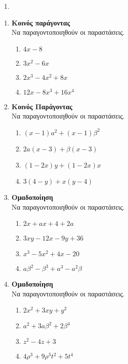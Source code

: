 \documentclass[twoside,nofonts,internet]{askhseis}
\begin{document}
\begin{enumerate}
\item 
\end{enumerate}
\twocolkentro{\askhseis}
\begin{enumerate}
\item \textbf{Κοινός παράγοντας}\\
Να παραγοντοποιηθούν οι παραστάσεις.
\begin{multicols}{2}
\begin{enumerate}[itemsep=0mm,label=\roman*.]
\item $ 4x-8 $
\item $ 3x^2-6x $
\item $ 2x^3-4x^2+8x $
\item $ 12x-8x^3+16x^4 $
\end{enumerate}
\end{multicols}
\item \textbf{Κοινός Παράγοντας}\\
Να παραγοντοποιηθούν οι παραστάσεις.
\begin{enumerate}[itemsep=0mm,label=\roman*.]
\item $ (x-1)a^2+(x-1)\beta^2 $
\item $ 2a(x-3)+\beta(x-3) $
\item $ (1-2x)y+(1-2x)x $
\item $ 3(4-y)+x(y-4) $
\end{enumerate}
\item \textbf{Ομαδοποίηση}\\
Να παραγοντοποιηθούν οι παραστάσεις.
\begin{enumerate}[itemsep=0mm,label=\roman*.]
\item $ 2x+ax+4+2a $
\item $ 3xy-12x-9y+36 $
\item $ x^3-5x^2+4x-20 $
\item $ a\beta^2-\beta^3+a^3-a^2\beta $
\end{enumerate}
\item \textbf{Ομαδοποίηση}\\
Να παραγοντοποιηθούν οι παραστάσεις.
\begin{enumerate}[itemsep=0mm,label=\roman*.]
\item $ 2x^2+3xy+y^2 $
\item $ a^2+3a\beta^2+2\beta^4 $
\item $ z^2-4z+3 $
\item $ 4\rho^3+9\rho^3t^2+5 t^4 $

\end{enumerate}
\end{enumerate}
\end{document}
